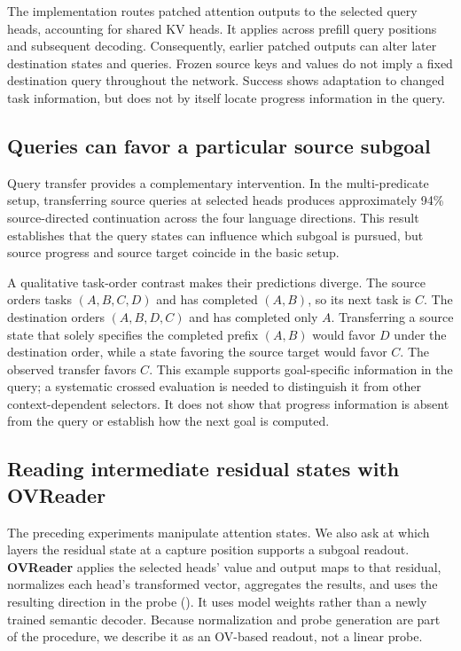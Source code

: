 The implementation routes patched attention outputs to the selected query heads, accounting for shared KV heads. It applies across prefill query positions and subsequent decoding. Consequently, earlier patched outputs can alter later destination states and queries. Frozen source keys and values do not imply a fixed destination query throughout the network. Success shows adaptation to changed task information, but does not by itself locate progress information in the query.

\subsection{Queries can favor a particular source subgoal}
\label{sec:mechanism:precommit}
Query transfer provides a complementary intervention. In the multi-predicate setup, transferring source queries at selected heads produces approximately 94\% source-directed continuation across the four language directions. This result establishes that the query states can influence which subgoal is pursued, but source progress and source target coincide in the basic setup.

A qualitative task-order contrast makes their predictions diverge. The source orders tasks $(A,B,C,D)$ and has completed $(A,B)$, so its next task is $C$. The destination orders $(A,B,D,C)$ and has completed only $A$. Transferring a source state that solely specifies the completed prefix $(A,B)$ would favor $D$ under the destination order, while a state favoring the source target would favor $C$. The observed transfer favors $C$. This example supports goal-specific information in the query; a systematic crossed evaluation is needed to distinguish it from other context-dependent selectors. It does not show that progress information is absent from the query or establish how the next goal is computed.

\subsection{Reading intermediate residual states with OVReader}
\label{sec:mechanism:upstream}
The preceding experiments manipulate attention states. We also ask at which layers the residual state at a capture position supports a subgoal readout. \textbf{OVReader} applies the selected heads' value and output maps to that residual, normalizes each head's transformed vector, aggregates the results, and uses the resulting direction in the \goalscope probe (). It uses model weights rather than a newly trained semantic decoder. Because normalization and probe generation are part of the procedure, we describe it as an OV-based readout, not a linear probe.

